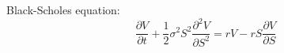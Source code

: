 \documentclass{standalone}
\begin{document}
Black-Scholes equation:
\begin{equation}
    \frac{\partial V}{\partial t}
    +
    \frac{1}{2} \sigma^2 S^2 
    \frac{\partial^2V}{\partial S^2}
    =
    rV
    -
    rS\frac{\partial V}{\partial S}
\end{equation}
\end{document}
